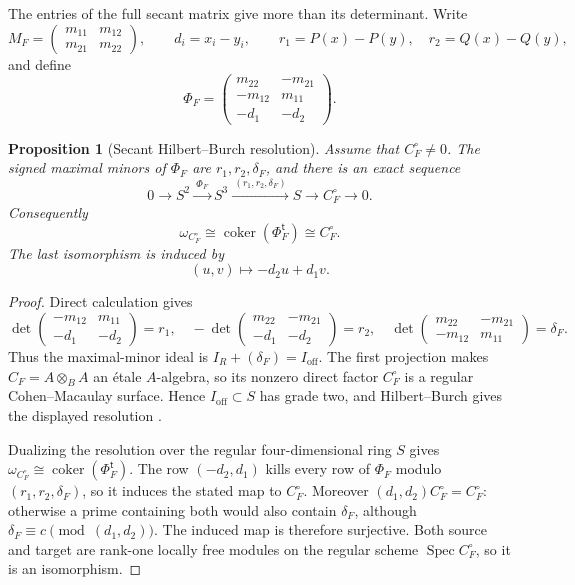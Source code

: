 \documentclass[11pt]{article}
\newtheorem{proposition}[theorem]{Proposition}
\theoremstyle{remark}
\theoremstyle{definition}
\DeclareMathOperator{\Spec}{Spec}
\begin{document}
The entries of the full secant matrix give more than its determinant.  Write
\[
  M_F=
  \begin{pmatrix}
    m_{11}&m_{12}\\
    m_{21}&m_{22}
  \end{pmatrix},
  \qquad
  d_i=x_i-y_i,
  \qquad
  r_1=P(x)-P(y),\quad r_2=Q(x)-Q(y),
\]
and define
\[
  \Phi_F=
  \begin{pmatrix}
    m_{22}&-m_{21}\\
    -m_{12}&m_{11}\\
    -d_1&-d_2
  \end{pmatrix}.
\]

\begin{proposition}[Secant Hilbert--Burch resolution]
\label{prop:secant-hilbert-burch}
Assume that \(C_F^\circ\ne0\).  The signed maximal minors of \(\Phi_F\)
are \(r_1,r_2,\delta_F\), and there is an exact sequence
\[
  0\longrightarrow S^2
  \xrightarrow{\ \Phi_F\ }S^3
  \xrightarrow{\ (r_1,r_2,\delta_F)\ }S
  \longrightarrow C_F^\circ\longrightarrow0.
\]
Consequently
\[
  \omega_{C_F^\circ}
  \cong\operatorname{coker}(\Phi_F^{\mathsf t})
  \cong C_F^\circ.
\]
The last isomorphism is induced by
\[
  (u,v)\longmapsto-d_2u+d_1v.
\]
\end{proposition}

\begin{proof}
Direct calculation gives
\[
  \det\!\begin{pmatrix}-m_{12}&m_{11}\\-d_1&-d_2\end{pmatrix}=r_1,
  \quad
  -\det\!\begin{pmatrix}m_{22}&-m_{21}\\-d_1&-d_2\end{pmatrix}=r_2,
  \quad
  \det\!\begin{pmatrix}m_{22}&-m_{21}\\-m_{12}&m_{11}\end{pmatrix}
  =\delta_F.
\]
Thus the maximal-minor ideal is
\(I_R+(\delta_F)=I_{\mathrm{off}}\).  The first projection makes
\(C_F=A\otimes_BA\) an \'etale \(A\)-algebra, so its nonzero direct factor
\(C_F^\circ\) is a regular Cohen--Macaulay surface.  Hence
\(I_{\mathrm{off}}\subset S\) has grade two, and Hilbert--Burch gives the
displayed resolution \cite{StacksComplexExactness}.

Dualizing the resolution over the regular four-dimensional ring \(S\) gives
\(\omega_{C_F^\circ}\cong\operatorname{coker}(\Phi_F^{\mathsf t})\).
The row \((-d_2,d_1)\) kills every row of \(\Phi_F\) modulo
\((r_1,r_2,\delta_F)\), so it induces the stated map to \(C_F^\circ\).
Moreover \((d_1,d_2)C_F^\circ=C_F^\circ\): otherwise a prime containing
both would also contain \(\delta_F\), although
\(\delta_F\equiv c\pmod{(d_1,d_2)}\).  The induced map is therefore
surjective.  Both source and target are rank-one locally free modules on the
regular scheme \(\Spec C_F^\circ\), so it is an isomorphism.
\end{proof}
\end{document}
